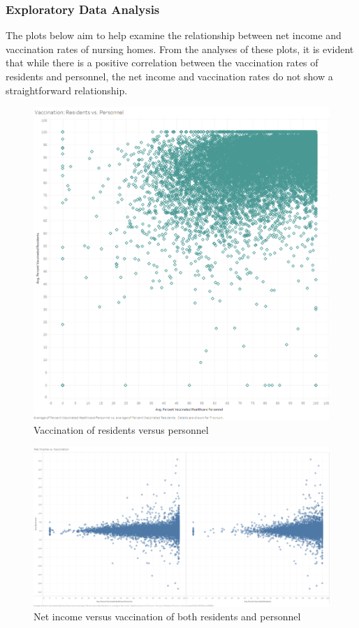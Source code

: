 \documentclass{article}
\theoremstyle{mytheoremstyle}
\theoremstyle{mytheoremstyle}
\theoremstyle{myproblemstyle}
\begin{document}
\subsubsection{Exploratory Data Analysis}
The plots below aim to help examine the relationship between net income and vaccination rates of nursing homes. From the analyses of these plots, it is evident that while there is a positive correlation between the vaccination rates of residents and personnel, the net income and vaccination rates do not show a straightforward relationship.
\begin{figure}[htbp]
\centering
\includegraphics[width=0.6\linewidth]{Images/Vaccination Residents vs. Personnel.png}
\caption{Vaccination of residents versus personnel}
\label{fig:vaccination scatterplot}
\end{figure}

\begin{figure}[htbp]
\centering
\includegraphics[width=\linewidth]{Images/Net Income vs. Vaccination.png}
\caption{Net income versus vaccination of both residents and personnel}
\label{fig:net income vs vacc}
\end{figure}
\end{document}

